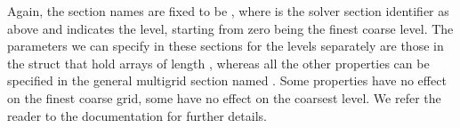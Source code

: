 Again, the section names are fixed to be , where  is the solver section identifier as above and  indicates the level, starting from zero being the finest coarse level.
The parameters we can specify in these sections for the levels separately are those in the  struct that hold arrays of length , whereas all the other properties can be specified in the general multigrid section named .
Some properties have no effect on the finest coarse grid, some have no effect on the coarsest level.
We refer the reader to the \quda documentation for further details.

